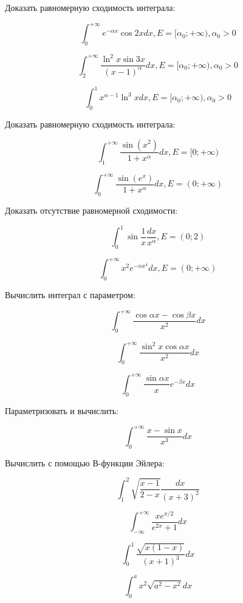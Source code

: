 \documentclass[russian]{article}
\begin{document}
Доказать равномерную сходимость интеграла:

$$ \int_0^{+\infty} e^{-\alpha x} \cos{2x} dx, E = [\alpha_0; +\infty), \alpha_0 > 0 $$

$$ \int_2^{+\infty} \frac{\ln^2x \sin{3x}}{(x - 1)^\alpha} dx , E = [\alpha_0; +\infty), \alpha_0 > 0 $$

$$ \int_0^1 x^{\alpha - 1} \ln^3xdx , E = [\alpha_0; +\infty), \alpha_0 > 0 $$

Доказать равномерную сходимость интеграла:

$$ \int_1^{+\infty} \frac{\sin(x^2)}{1 + x^\alpha} dx, E = [0;+\infty) $$

$$ \int_0^{+\infty} \frac{\sin(e^x)}{1 + x^\alpha} dx, E = (0; +\infty) $$

Доказать отсутствие равномерной сходимости:

$$ \int_0^1 \sin\frac{1}{x} \frac{dx}{x^\alpha}, E = (0; 2) $$

$$ \int_0^{+\infty} x^2 e^{-\alpha x^4} dx, E = (0; +\infty) $$

Вычислить интеграл с параметром:

$$ \int_0^{+\infty} \frac{\cos{\alpha x} - \cos{\beta x}}{x^2} dx $$

$$ \int_0^{+\infty} \frac{\sin^2x\cos\alpha x}{x^2} dx $$

$$ \int_0^{+\infty} \frac{\sin \alpha x}{x} e^{-\beta x} dx $$

Параметризовать и вычислить:

$$ \int_0^{+\infty} \frac{x - \sin x}{x^3} dx $$

Вычислить с помощью В-функции Эйлера:

$$ \int_1^2 \sqrt{\frac{x - 1}{2 - x}} \frac{dx}{(x + 3)^2} $$

$$ \int_{-\infty}^{+\infty} \frac{xe^{x/2}}{e^{2x} + 1}dx $$

$$ \int_0^1 \frac{\sqrt{x(1 - x)}}{(x + 1)^3} dx $$

$$ \int_0^a x^2\sqrt{a^2 - x^2} dx $$
\end{document}
